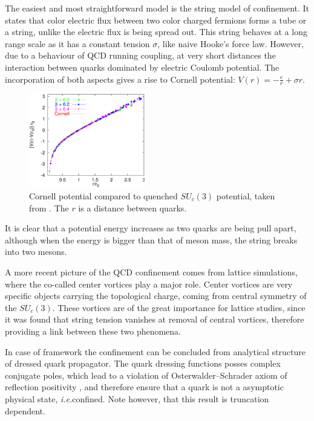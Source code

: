 The easiest and most straightforward model is the string model of confinement. It states that color electric flux between two color charged fermions forms a tube or a string, unlike the electric flux is being spread out. This string behaves at a long range scale as it has a constant tension $\sigma$, like naive Hooke's force law. However, due to a behaviour of QCD running coupling, at very short distances the interaction between quarks dominated by electric Coulomb potential. The incorporation of both aspects gives a rise to Cornell potential: $V(r) = - \frac{e}{r} + \sigma r$.
\begin{figure}[t]
\tiny
 \begin{center}
  \includegraphics[width=0.45\textwidth]{figures/cornell_V.png}
 \end{center}
 \caption{\small Cornell potential compared to quenched $SU_c(3)$ potential, taken from \cite{Bali:2000gf}. The $r$ is a distance between quarks.}\label{fig:cornell_V} 
\end{figure}
It is clear that a potential energy increases as two quarks are being pull apart, although when the energy is bigger than that of meson mass, the string breaks into two mesons.

A more recent picture of the QCD confinement comes from lattice simulations, where the co-called center vortices play a major role. Center vortices are very specific objects carrying the topological charge, coming from central symmetry of the $SU_c(3)$. These vortices are of the great importance for lattice studies, since it was found that string tension vanishes at removal of central vortices, therefore providing a link between these two phenomena.

In case of \DS framework the confinement can be concluded from analytical structure of dressed quark propagator. The quark dressing functions posses complex conjugate poles, which lead to a violation of Osterwalder--Schrader axiom of reflection positivity \cite{Osterwalder:1973dx}, and therefore ensure that a quark is not a asymptotic physical state, \textit{i.e.}confined. Note however, that this result is truncation dependent.

